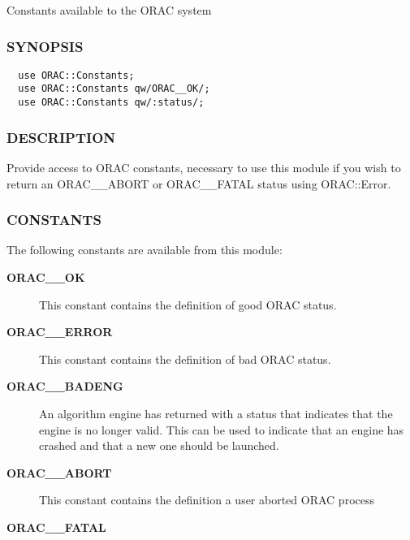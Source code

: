 \begin{description}
Constants available to the ORAC system

\subsubsection*{SYNOPSIS\label{ORAC::Constants_SYNOPSIS}}
\begin{verbatim}
  use ORAC::Constants;
  use ORAC::Constants qw/ORAC__OK/;
  use ORAC::Constants qw/:status/;
\end{verbatim}
\subsubsection*{DESCRIPTION\label{ORAC::Constants_DESCRIPTION}}


Provide access to ORAC constants, necessary to use this module if you wish
to return an ORAC\_\_ABORT or ORAC\_\_FATAL status using ORAC::Error.

\subsubsection*{CONSTANTS\label{ORAC::Constants_CONSTANTS}}


The following constants are available from this module:

\begin{description}

\item[{\textbf{ORAC\_\_OK}}] \mbox{}

This constant contains the definition of good ORAC status.


\item[{\textbf{ORAC\_\_ERROR}}] \mbox{}

This constant contains the definition of bad ORAC status.


\item[{\textbf{ORAC\_\_BADENG}}] \mbox{}

An algorithm engine has returned with a status that indicates
that the engine is no longer valid. This can be used to
indicate that an engine has crashed and that a new one should be
launched.


\item[{\textbf{ORAC\_\_ABORT}}] \mbox{}

This constant contains the definition a user aborted ORAC process


\item[{\textbf{ORAC\_\_FATAL}}] \mbox{}


\end{description}
\end{description}
